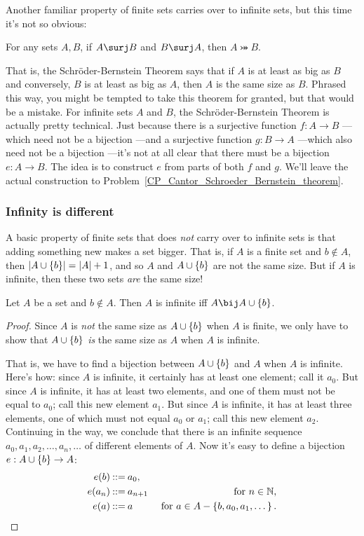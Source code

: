 Another familiar property of finite sets carries over to infinite sets,
but this time it's not so obvious:
\begin{theorem}  For any sets $A,B$, if $A \surj B$
  and $B \surj A$, then $A \bij B$.
\end{theorem}

That is, the Schr\"oder-Bernstein Theorem says that if $A$ is at least as
big as $B$ and conversely, $B$ is at least as big as $A$, then $A$ is the
same size as $B$.  Phrased this way, you might be tempted to take this
theorem for granted, but that would be a mistake.  For infinite sets $A$
and $B$, the Schr\"oder-Bernstein Theorem is actually pretty technical.
Just because there is a surjective function $f:A\to B$ ---which need not
be a bijection ---and a surjective function $g:B \to A$ ---which also need
not be a bijection ---it's not at all clear that there must be a bijection
$e:A \to B$.  The idea is to construct $e$ from parts of both $f$ and $g$.
We'll leave the actual construction to
Problem~\ref{CP_Cantor_Schroeder_Bernstein_theorem}.

\subsubsection{Infinity is different}

A basic property of finite sets that does \emph{not} carry over to
infinite sets is that adding something new makes a set bigger.  That is,
if $A$ is a finite set and $b \notin A$, then $\left|A \cup \left\{b\right\}\right| =
\left|A\right|+1$, and so $A$ and $A \cup \left\{b\right\}$ are not the same size.  But
if $A$ is infinite, then these two sets \emph{are} the same size!

\begin{lemma}\label{AUb}
  Let $A$ be a set and $b \notin A$.  Then $A$ is infinite iff $A \bij A
  \union \set{b}$.
\end{lemma}
\begin{proof}
  Since $A$ is \emph{not} the same size as $A \cup \left\{b\right\}$ when $A$ is
  finite, we only have to show that $A \cup \left\{b\right\}$ \emph{is} the same
  size as $A$ when $A$ is infinite.

That is, we have to find a bijection between $A \cup \left\{b\right\}$ and $A$
when $A$ is infinite.  Here's how: since $A$ is infinite, it certainly has
at least one element; call it $a_0$.  But since $A$ is infinite, it has at
least two elements, and one of them must not be equal to $a_0$; call this
new element $a_1$.  But since $A$ is infinite, it has at least three
elements, one of which must not equal $a_0$ or $a_1$; call this new
element $a_2$.  Continuing in the way, we conclude that there is an
infinite sequence $a_0,a_1,a_2,\dots,a_n,\dots$ of different elements of
$A$.  Now it's easy to define a bijection $e: A \cup \left\{b\right\} \to A$:
\begin{align*}
e(b) & \mathbin{::=} a_0,\\
e(a_n) & \mathbin{::=} a_{n+1}  &\text{ for } n \in \mathbb{N},\\
e(a) & \mathbin{::=} a & \text{ for } a \in A - \left\{b,a_0,a_1,\dots\right\}.
\end{align*}
\end{proof}

